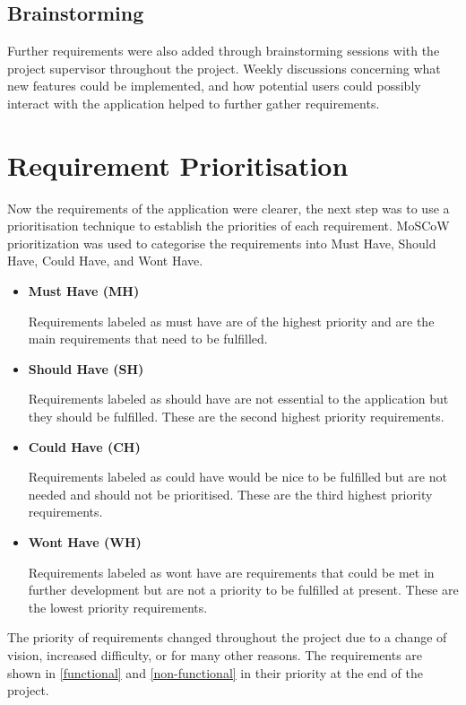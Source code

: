 \subsection{Brainstorming}
Further requirements were also added through brainstorming sessions with the project supervisor throughout the project. Weekly discussions concerning what new features could be implemented, and how potential users could possibly interact with the application helped to further gather requirements.
\section{Requirement Prioritisation}
Now the requirements of the application were clearer, the next step was to use a prioritisation technique to establish the priorities of  each requirement. MoSCoW prioritization \cite{moscow} was used to categorise the requirements into Must Have, Should Have, Could Have, and Wont Have.
\begin{itemize}
    \item \textbf{Must Have (MH)} \par
    Requirements labeled as must have are of the highest priority and are the main requirements that need to be fulfilled. 
    \item \textbf{Should Have (SH)} \par
    Requirements labeled as should have are not essential to the application but they should be fulfilled. These are the second highest priority requirements. 
    \item \textbf{Could Have (CH)} \par
    Requirements labeled as could have would be nice to be fulfilled but are not needed and should not be prioritised. These are the third highest priority requirements. 
    \item \textbf{Wont Have (WH)} \par
    Requirements labeled as wont have are requirements that could be met in further development but are not a priority to be fulfilled at present. These are the lowest priority requirements. 
\end{itemize}
The priority of requirements changed throughout the project due to a change of vision, increased difficulty, or for many other reasons. The requirements are shown in \ref{functional} and \ref{non-functional} in their priority at the end of the project.
